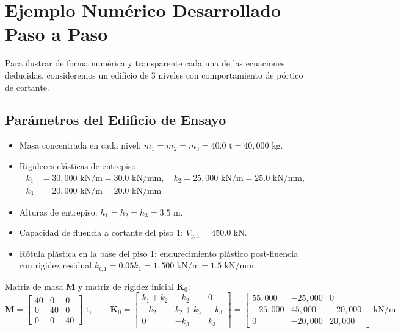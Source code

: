 \documentclass[11pt,letterpaper]{article}
\begin{document}
\section{Ejemplo Numérico Desarrollado Paso a Paso}

Para ilustrar de forma numérica y transparente cada una de las ecuaciones deducidas, consideremos un edificio de 3 niveles con comportamiento de pórtico de cortante.

\subsection{Parámetros del Edificio de Ensayo}

\begin{itemize}
    \item Masa concentrada en cada nivel: $m_1 = m_2 = m_3 = 40.0\text{ t} = 40,000\text{ kg}$.
    \item Rigideces elásticas de entrepiso:
    \begin{align}
        k_1 &= 30,000\text{ kN/m} = 30.0\text{ kN/mm}, \quad k_2 = 25,000\text{ kN/m} = 25.0\text{ kN/mm}, \nonumber\\
        k_3 &= 20,000\text{ kN/m} = 20.0\text{ kN/mm}
    \end{align}
    \item Alturas de entrepiso: $h_1 = h_2 = h_3 = 3.5\text{ m}$.
    \item Capacidad de fluencia a cortante del piso 1: $V_{y,1} = 450.0\text{ kN}$.
    \item Rótula plástica en la base del piso 1: endurecimiento plástico post-fluencia con rigidez residual $k_{t,1} = 0.05 k_1 = 1,500\text{ kN/m} = 1.5\text{ kN/mm}$.
\end{itemize}

Matriz de masa $\mathbf{M}$ y matriz de rigidez inicial $\mathbf{K}_0$:
\begin{equation}
    \mathbf{M} = \begin{bmatrix}
        40 & 0 & 0 \\
        0 & 40 & 0 \\
        0 & 0 & 40
    \end{bmatrix} \text{ t}, \qquad
    \mathbf{K}_0 = \begin{bmatrix}
        k_1 + k_2 & -k_2 & 0 \\
        -k_2 & k_2 + k_3 & -k_3 \\
        0 & -k_3 & k_3
    \end{bmatrix} =
    \begin{bmatrix}
        55,000 & -25,000 & 0 \\
        -25,000 & 45,000 & -20,000 \\
        0 & -20,000 & 20,000
    \end{bmatrix} \text{ kN/m}
\end{equation}
\end{document}
